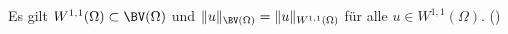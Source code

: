 %
%
%

\begin{remark}
  Es gilt $W^{1,1}(\Omega)\subset\BV(\Omega)$ und 
  $\Vert u \Vert_{\BV(\Omega)}=\Vert u \Vert_{W^{1,1}(\Omega)}$ für alle
  $u\in W^{1,1}(\Omega)$. (\cite[S. 394]{ABM14})
\end{remark}

